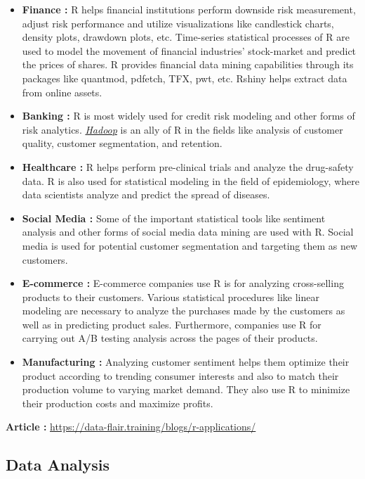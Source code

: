 \documentclass[
  letterpaper,
  DIV=11,
  numbers=noendperiod]{scrreprt}
\begin{document}
\begin{itemize}
\item
  \textbf{Finance :} R helps financial institutions perform downside
  risk measurement, adjust risk performance and utilize visualizations
  like candlestick charts, density plots, drawdown plots, etc.
  Time-series statistical processes of R are used to model the movement
  of financial industries' stock-market and predict the prices of
  shares. R provides financial data mining capabilities through its
  packages like quantmod, pdfetch, TFX, pwt, etc. Rshiny helps extract
  data from online assets.
\item
  \textbf{Banking :} R is most widely used for credit risk modeling and
  other forms of risk analytics.
  \href{https://data-flair.training/blogs/hadoop-tutorials-home/}{\emph{Hadoop}}
  is an ally of R in the fields like analysis of customer quality,
  customer segmentation, and retention.
\item
  \textbf{Healthcare :} R helps perform pre-clinical trials and analyze
  the drug-safety data. R is also used for statistical modeling in the
  field of epidemiology, where data scientists analyze and predict the
  spread of diseases.
\item
  \textbf{Social Media :} Some of the important statistical tools like
  sentiment analysis and other forms of social media data mining are
  used with R. Social media is used for potential customer segmentation
  and targeting them as new customers.
\item
  \textbf{E-commerce :} E-commerce companies use R is for analyzing
  cross-selling products to their customers. Various statistical
  procedures like linear modeling are necessary to analyze the purchases
  made by the customers as well as in predicting product sales.
  Furthermore, companies use R for carrying out A/B testing analysis
  across the pages of their products.
\item
  \textbf{Manufacturing :} Analyzing customer sentiment helps them
  optimize their product according to trending consumer interests and
  also to match their production volume to varying market demand. They
  also use R to minimize their production costs and maximize profits.
\end{itemize}

\textbf{Article :}
\url{https://data-flair.training/blogs/r-applications/}

\hypertarget{data-analysis}{%
\subsection{Data Analysis}\label{data-analysis}}
\end{document}
